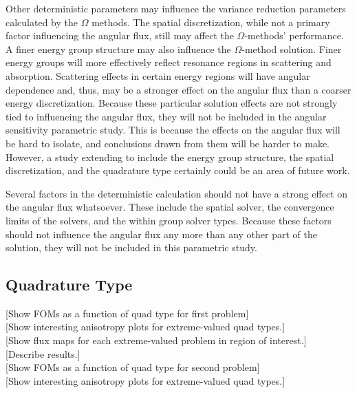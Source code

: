 Other deterministic parameters may influence the variance reduction parameters
calculated by the $\Omega$ methods.
The spatial discretization, while not a primary factor influencing
the angular flux, still may affect the $\Omega$-methods' performance.
A finer energy group structure may also influence the $\Omega$-method solution.
Finer energy groups will more effectively reflect resonance regions in
scattering and absorption. Scattering effects in certain energy regions will
have angular dependence and, thus, may be a stronger effect on the angular flux
than a coarser energy discretization. Because these particular solution effects
are not strongly tied to influencing the angular flux, they will not be included
in the angular sensitivity parametric study. This is because the effects on the
angular flux will be hard to isolate, and conclusions drawn
from them will be harder to make. However, a study extending to include the
energy group structure, the spatial discretization, and the quadrature type
certainly could be an area of future work.

Several factors in the deterministic calculation should not have a strong effect
on the angular flux whatsoever. These include the spatial solver, the
convergence limits of the solvers, and the within group solver types.
Because these factors should not influence the angular flux any more than any
other part of the solution, they will not be included in this parametric study.

\subsection{Quadrature Type}
\label{subsec:quadtype}

[Show FOMs as a function of quad type for first problem] \\

[Show interesting anisotropy plots for extreme-valued quad types.] \\

[Show flux maps for each extreme-valued problem in region of interest.] \\

[Describe results.] \\

[Show FOMs as a function of quad type for second problem] \\

[Show interesting anisotropy plots for extreme-valued quad types.] \\

